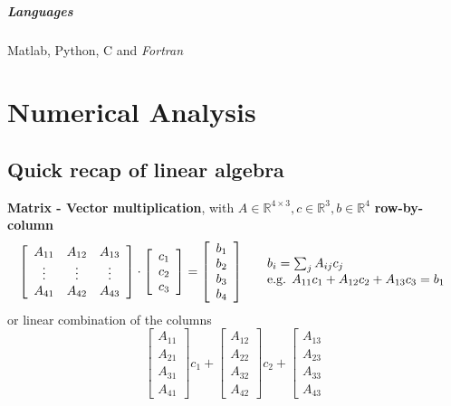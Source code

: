 \documentclass[10pt]{report}
\begin{document}
\paragraph{Languages} Matlab, Python, C and \textit{Fortran}
\chapter{Numerical Analysis}
\section{Quick recap of linear algebra}
\begin{list}{}{}
	\item \textbf{Matrix - Vector multiplication}, with $A\in \mathbb{R}^{4\times 3}, c\in \mathbb{R}^3, b\in \mathbb{R}^4$ \textbf{row-by-column}
	$$\left[\begin{array}{c c c}
		A_{11} & A_{12} & A_{13}\\
		\vdots & \vdots & \vdots\\
		A_{41} & A_{42} & A_{43}
	\end{array}\right]\cdot \left[\begin{array}{c}
		c_1\\c_2\\c_3
	\end{array}\right] = \left[\begin{array}{c}
		b_1\\b_2\\b_3\\b_4
	\end{array}\right]\:\:\:\:\:\:\begin{array}{l}
		b_i = \sum_{j} A_{ij}c_j\\
		\text{e.g. }A_{11}c_1 + A_{12}c_2 + A_{13}c_3 = b_1
	\end{array}$$
	or linear combination of the columns
	$$\left[\begin{array}{c}
	A_{11}\\A_{21}\\A_{31}\\A_{41}
	\end{array}\right]c_1 + \left[\begin{array}{c}
	A_{12}\\A_{22}\\A_{32}\\A_{42}
	\end{array}\right]c_2 + \left[\begin{array}{c}
	A_{13}\\A_{23}\\A_{33}\\A_{43}

\end{array}$$
\end{list}
\end{document}
